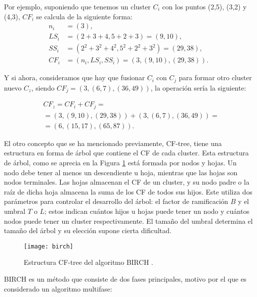 \documentclass[10pt, a4paper]{article}
\begin{document}
Por ejemplo, suponiendo que tenemos un cluster $C_i$ con los puntos (2,5), (3,2) y (4,3), $CF_i$ se calcula de la siguiente forma: 
\begin{align*}
n_i &= \left (3 \right), \\
LS_i &= \left (2 + 3 + 4, 5 + 2 + 3 \right) =  \left (9, 10 \right), \\
SS_i &= \left (2^2 + 3^2 + 4^2 , 5^2 + 2^2 + 3^2 \right) = \left (29, 38 \right), \\
CF_i &=  \left(n_i, LS_i, SS_i \right )= \left (3, \left (9, 10 \right), \left (29, 38 \right) \right).  
\end{align*}

Y si ahora, consideramos que hay que fusionar $C_i$ con $C_j$ para formar otro cluster nuevo $C_z$, siendo $CF_j = \left(3, \left(6,7 \right), \left(36,49 \right) \right)$, la operación sería la siguiente:

\begin{align*}
&CF_z = CF_i + CF_j = \\
&= \left(3, \left (9, 10 \right), \left (29, 38 \right) \right) +\left(3, \left(6,7 \right), \left(36,49 \right) \right)= \\
&= \left(6, \left(15,17 \right), \left(65,87 \right) \right).
\end{align*}


El otro concepto que se ha mencionado previamente, CF-tree, tiene una estructura en forma de árbol que contiene el CF de cada cluster. Esta estructura de árbol, como se aprecia en la Figura \ref{fig:birch} está formada por nodos y hojas. Un nodo debe tener al menos un descendiente u hoja, mientras que las hojas son nodos terminales. Las hojas  almacenan el CF de un cluster, y su nodo padre o la raíz de dicha hoja almacena la suma de los CF de todos sus hijos. Este utiliza dos parámetros para controlar el desarrollo del árbol: el factor de ramificación $B$ y el umbral $T$ o $L$; estos indican cuántos hijos u hojas puede tener un nodo y cuántos nodos puede tener un cluster respectivamente. El tamaño del umbral determina el tamaño del árbol y su elección supone cierta dificultad. 

\begin{figure}[ht]
\centering
\texttt{[image: birch]}
\caption{Estructura CF-tree del algoritmo BIRCH \cite{birchfoto}.}
\label{fig:birch}
\end{figure}

BIRCH es un método que consiste de dos fases principales, motivo por el que es considerado un algoritmo multifase:
\end{document}
